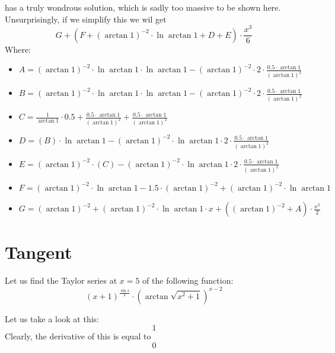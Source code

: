 \documentclass{article}
\begin{document}
has a truly wondrous solution, which is sadly too massive to be shown here.
Unsurprisingly, if we simplify this we wil get
\begin{equation}
G + \left( F + \left( \arctan 1 \right) ^{-2 } \cdot \ln \arctan 1 + D + E \right) \cdot \frac{x ^{3 } }{6 } 
\end{equation}
Where:
\begin{itemize}
	\item $A = \left( \arctan 1 \right) ^{-2 } \cdot \ln \arctan 1 \cdot \ln \arctan 1 - \left( \arctan 1 \right) ^{-2 } \cdot 2 \cdot \frac{0.5 \cdot \arctan 1 }{\left( \arctan 1 \right) ^{2 } } $
	\item $B = \left( \arctan 1 \right) ^{-2 } \cdot \ln \arctan 1 \cdot \ln \arctan 1 - \left( \arctan 1 \right) ^{-2 } \cdot 2 \cdot \frac{0.5 \cdot \arctan 1 }{\left( \arctan 1 \right) ^{2 } } $
	\item $C = \frac{1 }{\arctan 1 } \cdot 0.5 + \frac{0.5 \cdot \arctan 1 }{\left( \arctan 1 \right) ^{2 } } + \frac{0.5 \cdot \arctan 1 }{\left( \arctan 1 \right) ^{2 } } $
	\item $D = \left( B \right) \cdot \ln \arctan 1 - \left( \arctan 1 \right) ^{-2 } \cdot \ln \arctan 1 \cdot 2 \cdot \frac{0.5 \cdot \arctan 1 }{\left( \arctan 1 \right) ^{2 } } $
	\item $E = \left( \arctan 1 \right) ^{-2 } \cdot \left( C \right) - \left( \arctan 1 \right) ^{-2 } \cdot \ln \arctan 1 \cdot 2 \cdot \frac{0.5 \cdot \arctan 1 }{\left( \arctan 1 \right) ^{2 } } $
	\item $F = \left( \arctan 1 \right) ^{-2 } \cdot \ln \arctan 1 - 1.5 \cdot \left( \arctan 1 \right) ^{-2 } + \left( \arctan 1 \right) ^{-2 } \cdot \ln \arctan 1 $
	\item $G = \left( \arctan 1 \right) ^{-2 } + \left( \arctan 1 \right) ^{-2 } \cdot \ln \arctan 1 \cdot x + \left( \left( \arctan 1 \right) ^{-2 } + A \right) \cdot \frac{x ^{2 } }{2 } $
\end{itemize}

\newpage
\section{Tangent}
Let us find the Taylor series at $x = 5$ of the following function:
\begin{equation}
\left( x + 1 \right) ^{\frac{\sin x }{2 } } \cdot \left( \arctan \sqrt {x ^{2 } + 1 } \right) ^{x - 2 } 
\end{equation}

Let us take a look at this:
\begin{equation}
1 
\end{equation}
Clearly, the derivative of this is equal to
\begin{equation}
0 
\end{equation}
\end{document}
